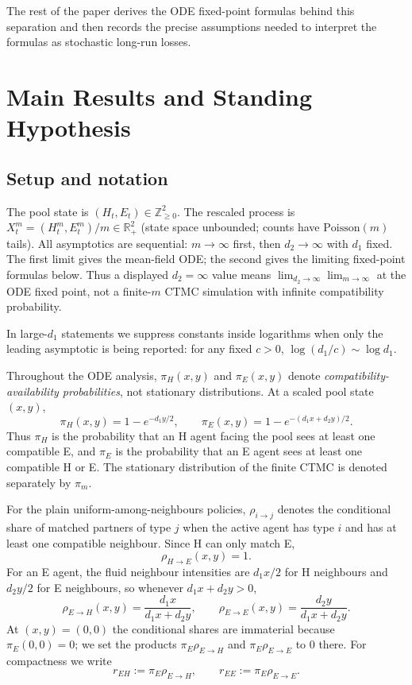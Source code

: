 \documentclass{article}
\theoremstyle{plain}
\theoremstyle{definition}
\begin{document}
The rest of the paper derives the ODE fixed-point formulas behind this separation and then records the precise assumptions needed to interpret the formulas as stochastic long-run losses.


\section{Main Results and Standing Hypothesis}
\label{sec:main}

\subsection{Setup and notation}

The pool state is $(H_t,E_t)\in\mathbb{Z}_{\ge 0}^2$. The rescaled process is $X^m_t=(H^m_t,E^m_t)/m\in\mathbb{R}_+^2$ (state space unbounded; counts have $\mathrm{Poisson}(m)$ tails). All asymptotics are sequential: $m\to\infty$ first, then $d_2\to\infty$ with $d_1$ fixed. The first limit gives the mean-field ODE; the second gives the limiting fixed-point formulas below. Thus a displayed $d_2=\infty$ value means $\lim_{d_2\to\infty}\lim_{m\to\infty}$ at the ODE fixed point, not a finite-$m$ CTMC simulation with infinite compatibility probability.

In large-$d_1$ statements we suppress constants inside logarithms when only the leading asymptotic is being reported: for any fixed $c>0$, $\log(d_1/c)\sim\log d_1$.

Throughout the ODE analysis, $\pi_H(x,y)$ and $\pi_E(x,y)$ denote \emph{compatibility-availability probabilities}, not stationary distributions. At a scaled pool state $(x,y)$,
\[
\pi_H(x,y)=1-e^{-d_1y/2},\qquad
\pi_E(x,y)=1-e^{-(d_1x+d_2y)/2}.
\]
Thus $\pi_H$ is the probability that an H agent facing the pool sees at least one compatible E, and $\pi_E$ is the probability that an E agent sees at least one compatible H or E. The stationary distribution of the finite CTMC is denoted separately by $\pi_m$.

For the plain uniform-among-neighbours policies, $\rho_{i\to j}$ denotes the conditional share of matched partners of type $j$ when the active agent has type $i$ and has at least one compatible neighbour. Since H can only match E,
\[
\rho_{H\to E}(x,y)=1.
\]
For an E agent, the fluid neighbour intensities are $d_1x/2$ for H neighbours and $d_2y/2$ for E neighbours, so whenever $d_1x+d_2y>0$,
\[
\rho_{E\to H}(x,y)=\frac{d_1x}{d_1x+d_2y},\qquad
\rho_{E\to E}(x,y)=\frac{d_2y}{d_1x+d_2y}.
\]
At $(x,y)=(0,0)$ the conditional shares are immaterial because $\pi_E(0,0)=0$; we set the products $\pi_E\rho_{E\to H}$ and $\pi_E\rho_{E\to E}$ to $0$ there. For compactness we write
\[
r_{EH}:=\pi_E\rho_{E\to H},\qquad r_{EE}:=\pi_E\rho_{E\to E}.
\]
\end{document}
